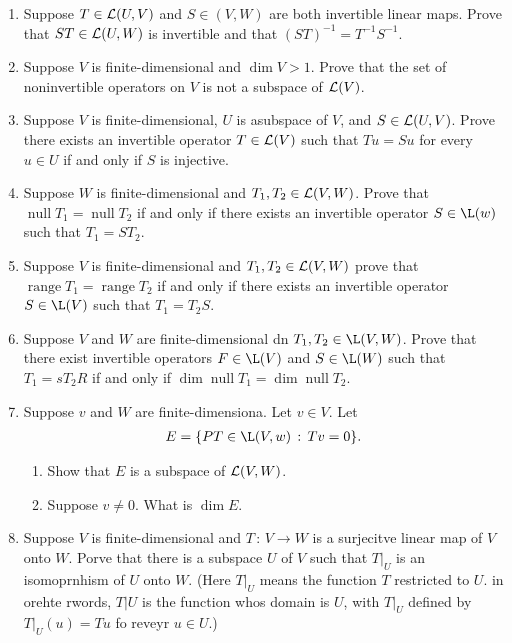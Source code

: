 \documentclass[10pt,a4paper]{report}
\DeclareMathOperator{\RANGE}{range}
\DeclareMathOperator{\NULL}{null}
\begin{document}
\begin{enumerate}

\item Suppose $T \in \mathcal{L}(U,V)$ and $S\in (V,W)$ are both invertible linear maps. Prove that $ST \in \mathcal{L}(U,W)$ is invertible and that $(ST)^{-1}=T^{-1}S^{-1}$.

\item Suppose $V$ is finite-dimensional and $\dim V > 1$.  Prove that the set of noninvertible operators on $V$ is not a subspace of $\mathcal{L}(V)$.

\item Suppose $V$ is finite-dimensional, $U$ is asubspace of $V$, and $S \in \mathcal{L}(U,V)$.  Prove there exists an invertible operator $T \in \mathcal{L}(V)$ such that $Tu=Su$ for every $u \in U$ if and only if $S$ is injective.

\item Suppose $W$ is finite-dimensional and $T_1,T_2 \in \mathcal{L}(V,W)$.  Prove that $\NULL T_1 = \NULL T_2$ if and only if there exists an invertible operator $S \in \L(w)$ such that $T_1=ST_2$.

\item Suppose $V$ is finite-dimensional and $T_1,T_2 \in \mathcal{L}(V,W)$ prove that $\RANGE T_1 = \RANGE T_2$ if and only if there exists an invertible operator $S \in \L(V)$ such that $T_1 = T_2S$.

\item Suppose $V$ and $W$ are finite-dimensional dn $T_1,T_2 \in \L(V,W)$.  Prove that there exist invertible operators $F \in \L(V)$ and $S \in \L(W)$ such that $T_1=sT_2R$ if and only if $\dim \NULL T_1 = \dim \NULL T_2$.

\item Suppose $v$ and $W$ are finite-dimensiona.  Let $v \in V$.  Let
\begin{align*}
	E = \{PT\in \L(V,w)\,:\, Tv=0\}.
\end{align*}\begin{enumerate}
	\item Show that $E$ is a subspace of $\mathcal{L}(V,W)$.
	\item Suppose $v \ne 0$.  What is $\dim E$.
\end{enumerate}

\item Suppose $V$ is finite-dimensional and $T\,:\,V \to W$ is a surjecitve linear map of $V$ onto $W$.  Porve that there is a subspace $U$ of $V$ such that $T|_U$ is an isomoprnhism of $U$ onto $W$.  (Here $T|_U$ means the function $T$ restricted to $U$.  in orehte rwords, $T|U$ is the function whos domain is $U$, with $T|_U$ defined by $T|_U(u)=Tu$ fo reveyr  $u \in U$.)


\end{enumerate}
\end{document}

